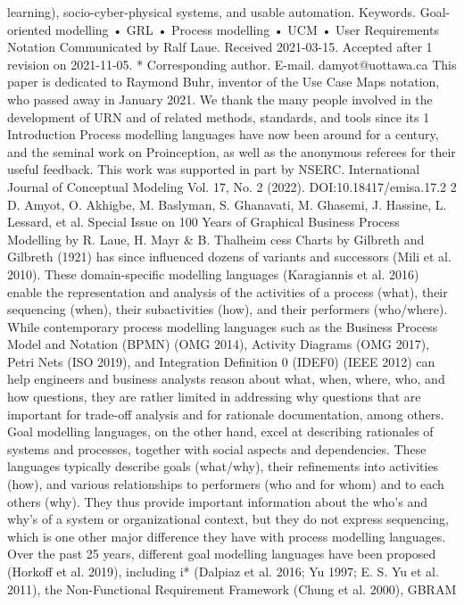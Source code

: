 learning), socio-cyber-physical systems, and usable automation.
Keywords. Goal-oriented modelling • GRL • Process modelling • UCM • User Requirements Notation
Communicated by Ralf Laue. Received 2021-03-15. Accepted after 1 revision on 2021-11-05.
* Corresponding author.
E-mail. damyot@uottawa.ca
This paper is dedicated to Raymond Buhr, inventor of the
Use Case Maps notation, who passed away in January 2021.
We thank the many people involved in the development of
URN and of related methods, standards, and tools since its
1 Introduction
Process modelling languages have now been
around for a century, and the seminal work on Proinception, as well as the anonymous referees for their useful
feedback. This work was supported in part by NSERC.
International Journal of Conceptual Modeling
Vol. 17, No. 2 (2022). DOI:10.18417/emisa.17.2
2 D. Amyot, O. Akhigbe, M. Baslyman, S. Ghanavati, M. Ghasemi, J. Hassine, L. Lessard, et al.
Special Issue on 100 Years of Graphical Business Process Modelling by R. Laue, H. Mayr & B. Thalheim
cess Charts by Gilbreth and Gilbreth (1921) has
since influenced dozens of variants and successors
(Mili et al. 2010). These domain-specific modelling languages (Karagiannis et al. 2016) enable
the representation and analysis of the activities of a
process (what), their sequencing (when), their subactivities (how), and their performers (who/where).
While contemporary process modelling languages
such as the Business Process Model and Notation
(BPMN) (OMG 2014), Activity Diagrams (OMG
2017), Petri Nets (ISO 2019), and Integration
Definition 0 (IDEF0) (IEEE 2012) can help engineers and business analysts reason about what,
when, where, who, and how questions, they are
rather limited in addressing why questions that are
important for trade-off analysis and for rationale
documentation, among others.
Goal modelling languages, on the other hand,
excel at describing rationales of systems and processes, together with social aspects and dependencies. These languages typically describe goals
(what/why), their refinements into activities (how),
and various relationships to performers (who and
for whom) and to each others (why). They thus provide important information about the who’s and
why’s of a system or organizational context, but
they do not express sequencing, which is one other
major difference they have with process modelling
languages.
Over the past 25 years, different goal modelling languages have been proposed (Horkoff et al.
2019), including i* (Dalpiaz et al. 2016; Yu 1997;
E. S. Yu et al. 2011), the Non-Functional Requirement Framework (Chung et al. 2000), GBRAM
